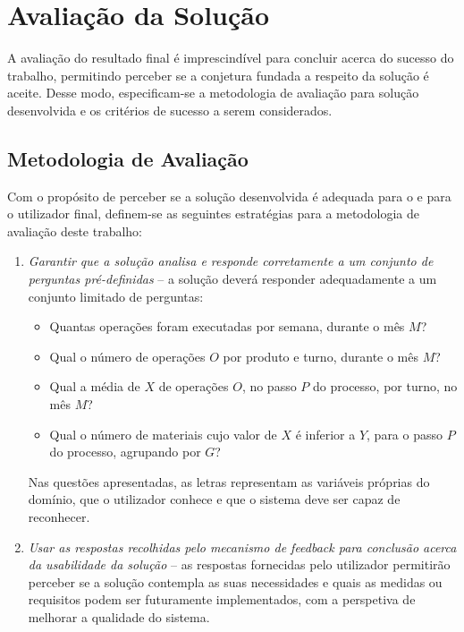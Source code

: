 \section{Avaliação da Solução}
\label{sec:chap01_solutionevaluation}

A avaliação do resultado final é imprescindível para concluir acerca do sucesso do trabalho, permitindo perceber se a conjetura fundada a respeito da solução é aceite. Desse modo, especificam-se a metodologia de avaliação para solução desenvolvida e os critérios de sucesso a serem considerados.

\subsection{Metodologia de Avaliação}
Com o propósito de perceber se a solução desenvolvida é adequada para o {\productname} e para o utilizador final, definem-se as seguintes estratégias para a metodologia de avaliação deste trabalho:

\begin{enumerate}
\label{enum:chap01_qualitystrategies}
    \item 
    {
        \textit{Garantir que a solução analisa e responde corretamente a um conjunto de perguntas pré-definidas} -- a solução deverá responder adequadamente a um conjunto limitado de perguntas:
        \begin{itemize}
            \item 
            {
                Quantas operações foram executadas por semana, durante o mês $M$?
            }
            \item
            {
                Qual o número de operações $O$ por produto e turno, durante o mês $M$?
            }
            \item
            {
                Qual a média de $X$ de operações $O$, no passo $P$ do processo, por turno, no mês $M$? 
            }
            \item
            {
                Qual o número de materiais cujo valor de $X$ é inferior a $Y$, para o passo $P$ do processo, agrupando por $G$?
            }
        \end{itemize}
        
        Nas questões apresentadas, as letras representam as variáveis próprias do domínio, que o utilizador conhece e que o sistema deve ser capaz de reconhecer.
    }
    \item
    {
        \textit{Usar as respostas recolhidas pelo mecanismo de feedback para conclusão acerca da usabilidade da solução} -- as respostas fornecidas pelo utilizador permitirão perceber se a solução contempla as suas necessidades e quais as medidas ou requisitos podem ser futuramente implementados, com a perspetiva de melhorar a qualidade do sistema.
    }
\end{enumerate}

